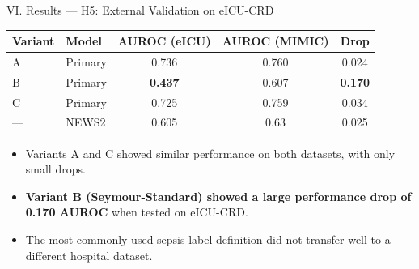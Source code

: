 \documentclass[aspectratio=169,10pt]{beamer}
\newcommand{\tablestyle}{%
  \renewcommand{\arraystretch}{1.2}%
  \small%
}
\begin{document}
\begin{frame}{VI. Results --- H5: External Validation on eICU-CRD~\cite{pollard2018eicu}}
\begin{center}
\tablestyle
\begin{tabular}{llccc}
\toprule
\textbf{Variant} & \textbf{Model} & \textbf{AUROC (eICU)} & \textbf{AUROC (MIMIC)} & \textbf{Drop} \\
\midrule
A & Primary & 0.736 & 0.760 & 0.024 \\
B & Primary & \textbf{0.437} & 0.607 & \textbf{0.170} \\
C & Primary & 0.725 & 0.759 & 0.034 \\
--- & NEWS2 & 0.605 & 0.63 & 0.025 \\
\bottomrule
\end{tabular}
\end{center}

\vspace{6pt}
\begin{itemize}
  \item Variants A and C showed similar performance on both datasets, with only small drops.
  \item \textbf{Variant B (Seymour-Standard) showed a large performance drop of 0.170 AUROC} when tested on eICU-CRD.
  \item The most commonly used sepsis label definition did not transfer well to a different hospital dataset.
\end{itemize}
\end{frame}
\end{document}
